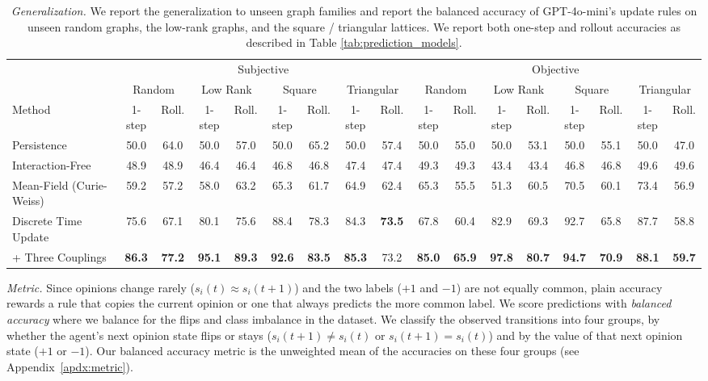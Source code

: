 \begin{table}[t]
\centering
\small
\setlength{\tabcolsep}{3pt}
\begin{adjustbox}{max width=\textwidth}
\begin{tabular}{l cccccccccccccccc}
\toprule
 & \multicolumn{8}{c}{Subjective} & \multicolumn{8}{c}{Objective} \\
\cmidrule(lr){2-9}\cmidrule(lr){10-17}
 & \multicolumn{2}{c}{Random} & \multicolumn{2}{c}{Low Rank} & \multicolumn{2}{c}{Square} & \multicolumn{2}{c}{Triangular} & \multicolumn{2}{c}{Random} & \multicolumn{2}{c}{Low Rank} & \multicolumn{2}{c}{Square} & \multicolumn{2}{c}{Triangular} \\
Method & 1-step & Roll. & 1-step & Roll. & 1-step & Roll. & 1-step & Roll. & 1-step & Roll. & 1-step & Roll. & 1-step & Roll. & 1-step & Roll. \\
\midrule
Persistence & 50.0 & 64.0 & 50.0 & 57.0 & 50.0 & 65.2 & 50.0 & 57.4 & 50.0 & 55.0 & 50.0 & 53.1 & 50.0 & 55.1 & 50.0 & 47.0 \\
Interaction-Free & 48.9 & 48.9 & 46.4 & 46.4 & 46.8 & 46.8 & 47.4 & 47.4 & 49.3 & 49.3 & 43.4 & 43.4 & 46.8 & 46.8 & 49.6 & 49.6 \\
Mean-Field (Curie-Weiss) & 59.2 & 57.2 & 58.0 & 63.2 & 65.3 & 61.7 & 64.9 & 62.4 & 65.3 & 55.5 & 51.3 & 60.5 & 70.5 & 60.1 & 73.4 & 56.9 \\
\midrule
Discrete Time Update & 75.6 & 67.1 & 80.1 & 75.6 & 88.4 & 78.3 & 84.3 & \textbf{73.5} & 67.8 & 60.4 & 82.9 & 69.3 & 92.7 & 65.8 & 87.7 & 58.8 \\
\quad + Three Couplings & \textbf{86.3} & \textbf{77.2} & \textbf{95.1} & \textbf{89.3} & \textbf{92.6} & \textbf{83.5} & \textbf{85.3} & 73.2 & \textbf{85.0} & \textbf{65.9} & \textbf{97.8} & \textbf{80.7} & \textbf{94.7} & \textbf{70.9} & \textbf{88.1} & \textbf{59.7} \\
\bottomrule
\end{tabular}
\end{adjustbox}
\caption{\textit{Generalization.} We report the generalization to unseen graph families and report the balanced accuracy of GPT-4o-mini's update rules on unseen random graphs,  the low-rank graphs, and the square / triangular lattices. We report both one-step and rollout accuracies as described in Table \ref{tab:prediction_models}.\label{tab:generalization}}
\end{table}

\textit{Metric.} Since opinions change rarely ($s_i(t) \approx s_i(t+1)$) and the two labels ($+1$ and $-1$) are not equally common, plain accuracy rewards a rule that copies the current opinion or one that always predicts the more common label. We score predictions with \emph{balanced accuracy} where we balance for the flips and class imbalance in the dataset. We classify the observed transitions into four groups, by whether the agent's next opinion state flips or stays ($s_i(t{+}1) \neq s_i(t)$ or $s_i(t{+}1) = s_i(t)$) and by the value of that next opinion state ($+1$ or $-1$). Our balanced accuracy metric is the unweighted mean of the accuracies on these four groups (see Appendix~\ref{apdx:metric}).

